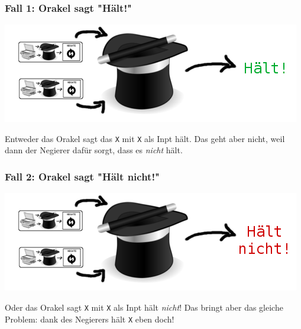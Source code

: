 \documentclass[aspectratio=43]{beamer}
\begin{document}
\begin{frame}
\frametitle{Fall 1: Orakel sagt "Hält!"}

\begin{center}
\includegraphics[scale=1.4]{images/input_hat_halts.png} 
\bigskip

Entweder das Orakel sagt das \texttt{X} mit \texttt{X} als Inpt hält. Das geht aber nicht, weil dann der Negierer dafür sorgt, dass es \emph{nicht} hält.
\end{center}
\end{frame}


\begin{frame}
\frametitle{Fall 2: Orakel sagt "Hält nicht!"}

\begin{center}
\includegraphics[scale=1.4]{images/input_hat_haltsnot.png} 
\bigskip

Oder das Orakel sagt \texttt{X} mit \texttt{X} als Inpt hält \emph{nicht}! Das bringt aber das gleiche Problem: dank des Negierers hält \texttt{X} eben doch! 
\end{center}
\end{frame}

\end{document}
